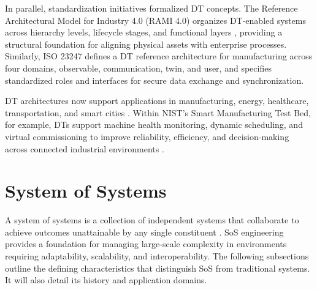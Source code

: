 In parallel, standardization initiatives formalized DT concepts. The Reference Architectural Model for Industry 4.0 (RAMI 4.0) organizes DT-enabled systems across hierarchy levels, lifecycle stages, and functional layers \cite{DIN91345}, providing a structural foundation for aligning physical assets with enterprise processes. Similarly, ISO 23247 \cite{ISO23247-1} defines a DT reference architecture for manufacturing across four domains, observable, communication, twin, and user, and specifies standardized roles and interfaces for secure data exchange and synchronization.

DT architectures now support applications in manufacturing, energy, healthcare, transportation, and smart cities \cite{hu2021digital}. Within NIST’s Smart Manufacturing Test Bed, for example, DTs support machine health monitoring, dynamic scheduling, and virtual commissioning to improve reliability, efficiency, and decision-making across connected industrial environments \cite{shao2021use}.


\section{System of Systems}\label{sec:background-sos}
A system of systems is a collection of independent systems that collaborate to achieve outcomes unattainable by any single constituent \cite{maier1998architecting}. SoS engineering provides a foundation for managing large-scale complexity in environments requiring adaptability, scalability, and interoperability.
The following subsections outline the defining characteristics that distinguish SoS from traditional systems. It will also detail its history and application domains.

